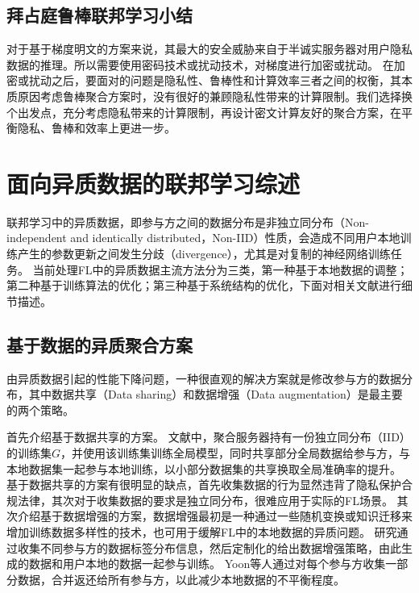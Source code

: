 \subsection{拜占庭鲁棒联邦学习小结}
对于基于梯度明文的方案来说，其最大的安全威胁来自于半诚实服务器对用户隐私数据的推理\cite{geiping2020inverting}。所以需要使用密码技术或扰动技术，对梯度进行加密或扰动。
在加密或扰动之后，要面对的问题是隐私性、鲁棒性和计算效率三者之间的权衡，其本质原因考虑鲁棒聚合方案时，没有很好的兼顾隐私性带来的计算限制。我们选择换个出发点，充分考虑隐私带来的计算限制，再设计密文计算友好的聚合方案，在平衡隐私、鲁棒和效率上更进一步。

\section{面向异质数据的联邦学习综述}
\label{sec:noniid}
联邦学习中的异质数据，即参与方之间的数据分布是非独立同分布（Non-independent and identically distributed，Non-IID）性质，会造成不同用户本地训练产生的参数更新之间发生分歧（divergence），尤其是对复制的神经网络训练任务。
当前处理FL中的异质数据主流方法分为三类，第一种基于本地数据的调整；第二种基于训练算法的优化；第三种基于系统结构的优化，下面对相关文献进行细节描述。

\subsection{基于数据的异质聚合方案}
由异质数据引起的性能下降问题，一种很直观的解决方案就是修改参与方的数据分布，其中数据共享（Data sharing）和数据增强（Data augmentation）\cite{tanner1987calculation}是最主要的两个策略。

首先介绍基于数据共享的方案\cite{zhao2018federated, yoshida2020hybrid, tuor2021overcoming}。
文献\cite{zhao2018federated}中，聚合服务器持有一份独立同分布（IID）的训练集$G$，并使用该训练集训练全局模型，同时共享部分全局数据给参与方，与本地数据集一起参与本地训练，以小部分数据集的共享换取全局准确率的提升。
基于数据共享的方案有很明显的缺点，首先收集数据的行为显然违背了隐私保护合规法律，其次对于收集数据的要求是独立同分布，很难应用于实际的FL场景。
其次介绍基于数据增强的方案\cite{duan2019astraea, shin2020xor, yoonfedmix}，数据增强\cite{tanner1987calculation}最初是一种通过一些随机变换或知识迁移来增加训练数据多样性的技术，也可用于缓解FL中的本地数据的异质问题。
研究\cite{duan2019astraea}通过收集不同参与方的数据标签分布信息，然后定制化的给出数据增强策略，由此生成的数据和用户本地的数据一起参与训练。
Yoon等人\cite{yoonfedmix}通过对每个参与方收集一部分数据，合并返还给所有参与方，以此减少本地数据的不平衡程度。

